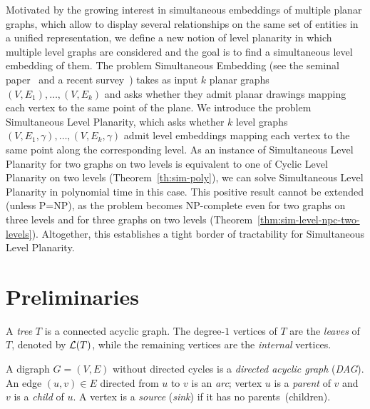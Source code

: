 \documentclass{llncs}
\newcommand{\NPC}{\mbox{NP-complete}\xspace}
\begin{document}
Motivated by the growing interest in simultaneous embeddings of multiple planar graphs, which allow to display several relationships on the same set of entities in a unified representation, we define a new notion of level planarity in which multiple level graphs are considered and the goal is to find a simultaneous level embedding of them. 
The problem {\sc Simultaneous Embedding} (see the seminal paper~\cite{bcdeeiklm-spge-07} and a recent survey~\cite{bkr-sepg-13}) takes as input $k$ planar graphs $(V,E_1),\dots,(V,E_k)$ and asks whether they admit planar drawings mapping each vertex to the same point of the plane. We introduce the problem {\sc Simultaneous Level Planarity}, which asks whether $k$ level graphs $(V,E_1,\gamma),\dots,(V,E_k,\gamma)$ admit level embeddings mapping each vertex to the same point along the corresponding level.
As an instance of {\sc Simultaneous Level Planarity} for two graphs on two levels is equivalent to one of {\sc Cyclic Level Planarity} on two levels (Theorem~\ref{th:sim-poly}), we can solve {\sc Simultaneous Level Planarity} in polynomial time in this case. This positive result cannot be extended (unless P=NP), as the problem becomes \NPC even for two graphs on three levels and for three graphs on two levels (Theorem~\ref{thm:sim-level-npc-two-levels}). Altogether, this establishes a tight border of tractability for {\sc Simultaneous Level Planarity}.


\section{Preliminaries} \label{se:preliminaries}

A {\em tree} $T$ is a connected acyclic graph. The degree-$1$ vertices of $T$ are the {\em leaves} of $T$, denoted by ${\cal L}(T)$, while the remaining vertices are the {\em internal} vertices. 

A digraph $G=(V,E)$ without directed cycles is a {\em directed acyclic graph} ({\em DAG}). 
An edge $(u, v) \in E$ directed from $u$ to $v$ is an \emph{arc}; vertex $u$ is a {\em parent} of $v$ and $v$ is a {\em child} of $u$.
A vertex is a {\em source} ({\em sink}) if it has no parents~(children).
\end{document}

